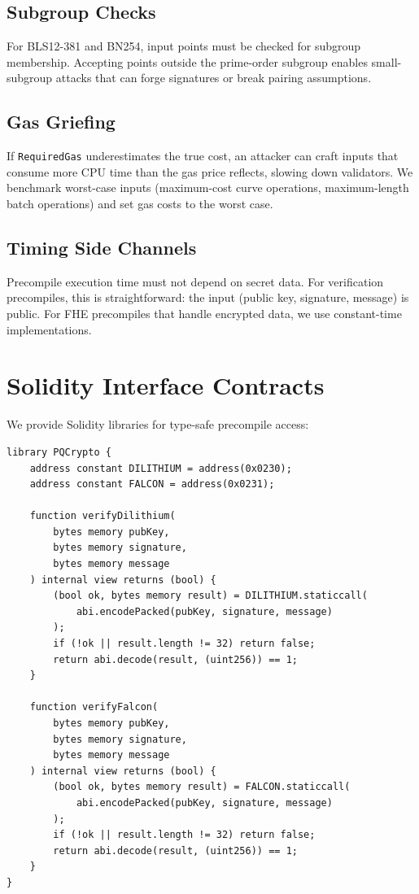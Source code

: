 \documentclass[11pt,a4paper]{article}
\begin{document}
\subsection{Subgroup Checks}

For BLS12-381 and BN254, input points must be checked for subgroup membership.
Accepting points outside the prime-order subgroup enables small-subgroup attacks
that can forge signatures or break pairing assumptions.

\subsection{Gas Griefing}

If \texttt{RequiredGas} underestimates the true cost, an attacker can craft inputs
that consume more CPU time than the gas price reflects, slowing down validators.
We benchmark worst-case inputs (maximum-cost curve operations, maximum-length batch
operations) and set gas costs to the worst case.

\subsection{Timing Side Channels}

Precompile execution time must not depend on secret data. For verification precompiles,
this is straightforward: the input (public key, signature, message) is public. For FHE
precompiles that handle encrypted data, we use constant-time implementations.

\section{Solidity Interface Contracts}

We provide Solidity libraries for type-safe precompile access:

\begin{lstlisting}[language=Solidity,caption={Solidity interface library}]
library PQCrypto {
    address constant DILITHIUM = address(0x0230);
    address constant FALCON = address(0x0231);

    function verifyDilithium(
        bytes memory pubKey,
        bytes memory signature,
        bytes memory message
    ) internal view returns (bool) {
        (bool ok, bytes memory result) = DILITHIUM.staticcall(
            abi.encodePacked(pubKey, signature, message)
        );
        if (!ok || result.length != 32) return false;
        return abi.decode(result, (uint256)) == 1;
    }

    function verifyFalcon(
        bytes memory pubKey,
        bytes memory signature,
        bytes memory message
    ) internal view returns (bool) {
        (bool ok, bytes memory result) = FALCON.staticcall(
            abi.encodePacked(pubKey, signature, message)
        );
        if (!ok || result.length != 32) return false;
        return abi.decode(result, (uint256)) == 1;
    }
}
\end{lstlisting}
\end{document}
